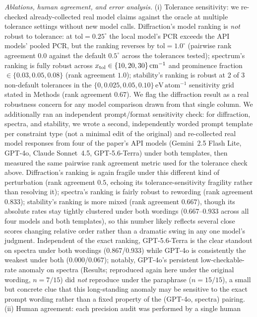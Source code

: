 \documentclass[pdflatex,sn-nature]{sn-jnl}
\begin{document}
\noindent\emph{Ablations, human agreement, and error analysis.} (i) Tolerance sensitivity:
we re-checked already-collected real model claims against the oracle at multiple tolerance
settings without new model calls. Diffraction's model ranking is \emph{not} robust to
tolerance: at $\mathrm{tol}=0.25^\circ$ the local model's PCR exceeds the API models'
pooled PCR, but the ranking reverses by $\mathrm{tol}=1.0^\circ$ (pairwise rank agreement
$0.0$ against the default $0.5^\circ$ across the tolerances tested); spectrum's ranking is
fully robust across $x_{\rm tol}\in\{10,20,30\}\,\mathrm{cm}^{-1}$ and prominence fraction
$\in\{0.03,0.05,0.08\}$ (rank agreement $1.0$); stability's ranking is robust at 2 of 3
non-default tolerances in the $\{0,0.025,0.05,0.10\}\,\mathrm{eV\,atom^{-1}}$ sensitivity
grid stated in Methods (rank agreement $0.67$). We flag the diffraction result as a real robustness concern
for any model comparison drawn from that single column. We additionally ran an independent
prompt/format sensitivity check: for diffraction, spectra, and stability, we wrote a second,
independently worded prompt template per constraint type (not a minimal edit of the
original) and re-collected real model responses from four of the paper's API models
(Gemini~2.5 Flash Lite, GPT-4o, Claude Sonnet~4.5, GPT-5.6-Terra) under both templates, then
measured the same pairwise rank agreement metric used for the tolerance check above.
Diffraction's ranking is again fragile under this different kind of perturbation (rank
agreement $0.5$, echoing its tolerance-sensitivity fragility rather than resolving it);
spectra's ranking is fairly robust to rewording (rank agreement $0.833$); stability's ranking
is more mixed (rank agreement $0.667$), though its absolute rates stay tightly clustered
under both wordings ($0.667$--$0.933$ across all four models and both templates), so this
number likely reflects several close scores changing relative order rather than a dramatic
swing in any one model's judgment. Independent of the exact ranking, GPT-5.6-Terra is the
clear standout on spectra under both wordings ($0.867$/$0.933$) while GPT-4o is consistently
the weakest under both ($0.000$/$0.067$); notably, GPT-4o's persistent low-checkable-rate
anomaly on spectra (Results; reproduced again here under the original wording, $n=7/15$) did
\emph{not} reproduce under the paraphrase ($n=15/15$), a small but concrete clue that this
long-standing anomaly may be sensitive to the exact prompt wording rather than a fixed
property of the (GPT-4o, spectra) pairing. (ii) Human agreement: each precision audit was performed by a single human
\end{document}

